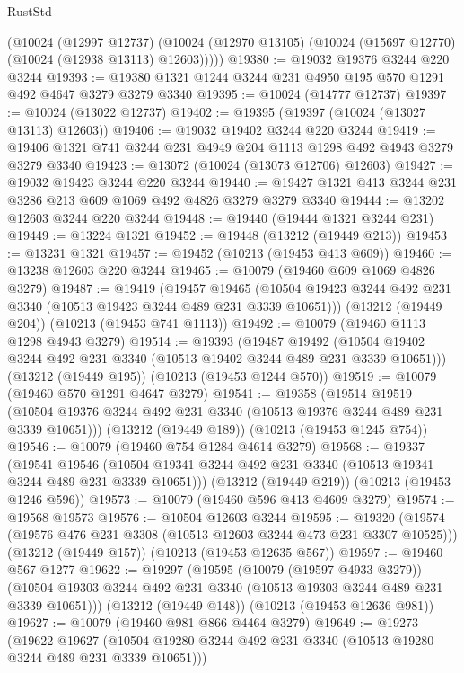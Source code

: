 \begin{lexlean}{RustStd}
\begin{coremodule}
      (@10024
        (@12997 @12737)
        (@10024 (@12970 @13105) (@10024 (@15697 @12770) (@10024 (@12938 @13113) @12603)))))
@19380 := @19032 @19376 @3244 @220 @3244
@19393 := @19380 @1321 @1244 @3244 @231 @4950 @195 @570 @1291 @492 @4647 @3279 @3279 @3340
@19395 := @10024 (@14777 @12737)
@19397 := @10024 (@13022 @12737)
@19402 := @19395 (@19397 (@10024 (@13027 @13113) @12603))
@19406 := @19032 @19402 @3244 @220 @3244
@19419 := @19406 @1321 @741 @3244 @231 @4949 @204 @1113 @1298 @492 @4943 @3279 @3279 @3340
@19423 := @13072 (@10024 (@13073 @12706) @12603)
@19427 := @19032 @19423 @3244 @220 @3244
@19440 := @19427 @1321 @413 @3244 @231 @3286 @213 @609 @1069 @492 @4826 @3279 @3279 @3340
@19444 := @13202 @12603 @3244 @220 @3244
@19448 := @19440 (@19444 @1321 @3244 @231)
@19449 := @13224 @1321
@19452 := @19448 (@13212 (@19449 @213))
@19453 := @13231 @1321
@19457 := @19452 (@10213 (@19453 @413 @609))
@19460 := @13238 @12603 @220 @3244
@19465 := @10079 (@19460 @609 @1069 @4826 @3279)
@19487 := @19419
    (@19457
      @19465
      (@10504 @19423 @3244 @492 @231 @3340 (@10513 @19423 @3244 @489 @231 @3339 @10651)))
    (@13212 (@19449 @204))
    (@10213 (@19453 @741 @1113))
@19492 := @10079 (@19460 @1113 @1298 @4943 @3279)
@19514 := @19393
    (@19487
      @19492
      (@10504 @19402 @3244 @492 @231 @3340 (@10513 @19402 @3244 @489 @231 @3339 @10651)))
    (@13212 (@19449 @195))
    (@10213 (@19453 @1244 @570))
@19519 := @10079 (@19460 @570 @1291 @4647 @3279)
@19541 := @19358
    (@19514
      @19519
      (@10504 @19376 @3244 @492 @231 @3340 (@10513 @19376 @3244 @489 @231 @3339 @10651)))
    (@13212 (@19449 @189))
    (@10213 (@19453 @1245 @754))
@19546 := @10079 (@19460 @754 @1284 @4614 @3279)
@19568 := @19337
    (@19541
      @19546
      (@10504 @19341 @3244 @492 @231 @3340 (@10513 @19341 @3244 @489 @231 @3339 @10651)))
    (@13212 (@19449 @219))
    (@10213 (@19453 @1246 @596))
@19573 := @10079 (@19460 @596 @413 @4609 @3279)
@19574 := @19568 @19573
@19576 := @10504 @12603 @3244
@19595 := @19320
    (@19574 (@19576 @476 @231 @3308 (@10513 @12603 @3244 @473 @231 @3307 @10525)))
    (@13212 (@19449 @157))
    (@10213 (@19453 @12635 @567))
@19597 := @19460 @567 @1277
@19622 := @19297
    (@19595
      (@10079 (@19597 @4933 @3279))
      (@10504 @19303 @3244 @492 @231 @3340 (@10513 @19303 @3244 @489 @231 @3339 @10651)))
    (@13212 (@19449 @148))
    (@10213 (@19453 @12636 @981))
@19627 := @10079 (@19460 @981 @866 @4464 @3279)
@19649 := @19273
    (@19622
      @19627
      (@10504 @19280 @3244 @492 @231 @3340 (@10513 @19280 @3244 @489 @231 @3339 @10651)))

\end{coremodule}
\end{lexlean}
